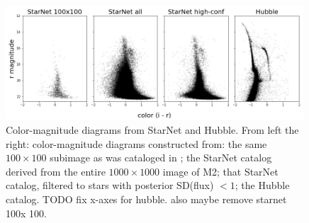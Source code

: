 \begin{figure}[tb]
    \centering
    \includegraphics[width=0.99\textwidth]{figures/m2_results/m2_cmd.png}
    \vspace{-0.5cm}
    \caption{Color-magnitude diagrams from StarNet and Hubble. From left the right: color-magnitude diagrams constructed from: the same $100\times100$ subimage as was cataloged in \cite{Feder_2019}; 
    the StarNet catalog derived from the entire $1000 \times 1000$ image of M2; 
    that StarNet catalog, filtered to stars with posterior SD(flux) $< 1$; the Hubble catalog. 
    TODO fix x-axes for hubble. also maybe remove starnet 100x 100. 
}
    \label{fig:m2_cmd}
\end{figure}






